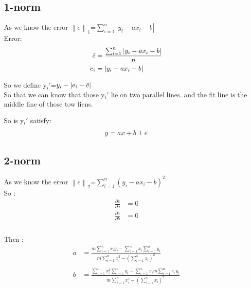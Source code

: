 \documentclass[12pt,a4paper]{article}
\begin{document}
\subsection{1-norm}
 

As we know the error $\left\|e\right\|_1$=$\sum_{i=1}^n|y_i-ax_i-b|$\\

Error: \\
\begin{equation}
	\begin{aligned}
		\Bar{e} &= \frac{\sum_{i=1}^n|y_i-ax_i-b|}{n} \\
		e_i &= |y_i-ax_i-b|\\
	\end{aligned}
\end{equation}

So we define y$_i$$'$=$y_i-| e_i- \Bar{e} |$\\

\noindent So that we can know that those  y$_i$$'$ lie on two parallel lines. and the fit line is the middle line of those tow liens. 

So is y$_i$$'$ satisfy:\\
\begin{equation}
	\begin{aligned}
		y &= ax+b \pm \Bar{e} \\ 
	\end{aligned}
\end{equation}
 



\newpage
\subsection{2-norm}
As we know the error $\left\|e\right\|_2$=$\sum_{i=1}^n(y_i-ax_i-b)^2$\\

So : 
\begin{equation}
	\begin{aligned}
		\frac{\partial e}{\partial a} &= 0 \\
		\frac{\partial e}{\partial b} &= 0 \\\\
	\end{aligned}
\end{equation}

Then :
\begin{equation}
	\begin{aligned}
		a &= \frac{m \sum_{i=1}^n{x_i y_i}-\sum_{i=1}^n{x_i} \sum_{i=1}^n{y_i}}{m \sum_{i=1}^n{x_i^2}-(\sum_{i=1}^n{x_i})^2}\\\\
		b &= \frac{\sum_{i=1}^n{x_i^2} \sum_{i=1}^n{y_i}-\sum_{i=1}^n{x_i} m \sum_{i=1}^n{x_i y_i}}{m \sum_{i=1}^n{x_i^2}-(\sum_{i=1}^n{x_i})^2}
	\end{aligned}
\end{equation}
\end{document}
